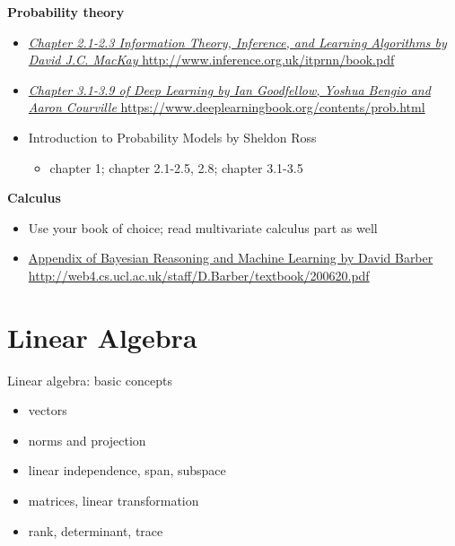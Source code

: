 \documentclass[ignorenonframetext,]{beamer}
\providecommand{\tightlist}{%
  \setlength{\itemsep}{0pt}\setlength{\parskip}{0pt}}
\begin{document}
\begin{frame}{}
\protect\hypertarget{section}{}

\textbf{Probability theory}

\begin{itemize}
\tightlist
\item
  \href{http://www.inference.org.uk/itprnn/book.pdf}{\emph{Chapter
  2.1-2.3 Information Theory, Inference, and Learning Algorithms by
  David J.C. MacKay} http://www.inference.org.uk/itprnn/book.pdf}
\item
  \href{https://www.deeplearningbook.org/contents/prob.html}{\emph{Chapter
  3.1-3.9 of Deep Learning by Ian Goodfellow, Yoshua Bengio and Aaron
  Courville} https://www.deeplearningbook.org/contents/prob.html}
\item
  Introduction to Probability Models by Sheldon Ross

  \begin{itemize}
  \tightlist
  \item
    chapter 1; chapter 2.1-2.5, 2.8; chapter 3.1-3.5
  \end{itemize}
\end{itemize}

\textbf{Calculus}

\begin{itemize}
\tightlist
\item
  Use your book of choice; read multivariate calculus part as well
\item
  \href{http://web4.cs.ucl.ac.uk/staff/D.Barber/textbook/200620.pdf}{Appendix
  of Bayesian Reasoning and Machine Learning by David Barber
  http://web4.cs.ucl.ac.uk/staff/D.Barber/textbook/200620.pdf}
\end{itemize}

\end{frame}

\hypertarget{linear-algebra}{%
\section{Linear Algebra}\label{linear-algebra}}

\begin{frame}{Linear algebra: basic concepts}
\protect\hypertarget{linear-algebra-basic-concepts}{}

\begin{itemize}
\tightlist
\item
  vectors \bigskip
\item
  norms and projection \bigskip
\item
  linear independence, span, subspace \bigskip
\item
  matrices, linear transformation \bigskip
\item
  rank, determinant, trace
\end{itemize}

\end{frame}
\end{document}
